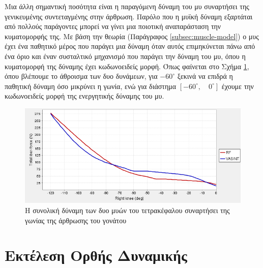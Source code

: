 Μια άλλη σημαντική ποσότητα είναι η παραγόμενη δύναμη του μυ συναρτήσει της γενικευμένης συντεταγμένης στην άρθρωση. Παρόλο που η μυϊκή δύναμη εξαρτάται από πολλούς παράγοντες μπορεί να γίνει μια ποιοτική αναπαράσταση την κυματομορφής της. Με βάση την θεωρία (Παράγραφος \ref{subsec:muscle-model}) ο μυς έχει ένα παθητικό μέρος που παράγει μια δύναμη όταν αυτός επιμηκύνεται πάνω από ένα όριο και έναν συσταλτικό μηχανισμό που παράγει την δύναμη του μυ, όπου η κυματομορφή της δύναμης έχει κωδωνοειδείς μορφή. Όπως φαίνεται στο Σχήμα \ref{fig:total-fiber-force}, όπου βλέπουμε το άθροισμα των δυο δυνάμεων, για $-60^{\circ}$ ξεκινά να επιδρά η παθητική δύναμη όσο μικρύνει η γωνία, ενώ για διάστημα $[-60^{\circ},\quad 0^{\circ}]$ έχουμε την κωδωνοειδείς μορφή της ενεργητικής δύναμης του μυ.

\begin{figure}[H]
    \centering
    \includegraphics[width=0.8\linewidth, keepaspectratio]{fig/total-fiber-force.png}
    \caption{Η συνολική δύναμη των δυο μυών του τετρακέφαλου συναρτήσει της γωνίας της άρθρωσης του γονάτου}
    \label{fig:total-fiber-force}
\end{figure}

\section{Εκτέλεση Ορθής Δυναμικής}

